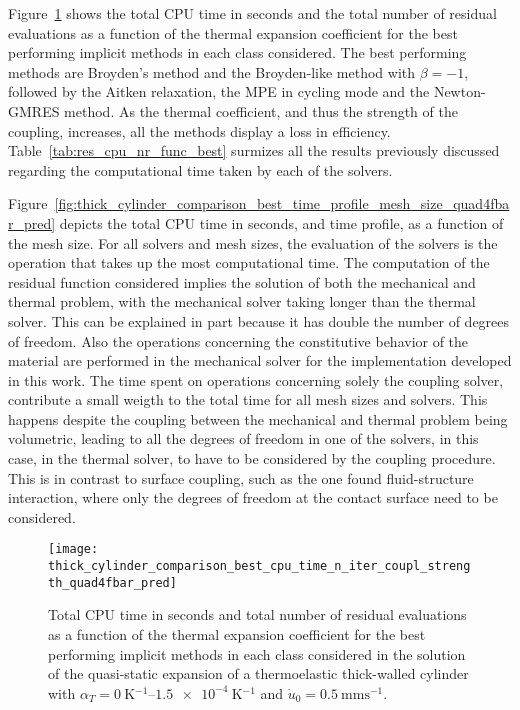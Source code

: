 Figure~\ref{fig:thick_cylinder_comparison_best_cpu_time_n_iter_coupl_strength_quad4fbar_pred} shows the total CPU time in seconds and the total number of residual evaluations as a function of the thermal expansion coefficient for the  best performing implicit methods in each class considered.
The best performing methods are Broyden's method and the Broyden-like method with \(\beta=-1\), followed by the Aitken relaxation, the MPE in cycling mode and the Newton-GMRES method.
As the thermal coefficient, and thus the strength of the coupling, increases, all the methods display a loss in efficiency.
Table~\ref{tab:res_cpu_nr_func_best} surmizes all the results previously discussed regarding the computational time taken by each of the solvers.

Figure~\ref{fig:thick_cylinder_comparison_best_time_profile_mesh_size_quad4fbar_pred} depicts the total CPU time in seconds, and time profile, as a function of the mesh size.
For all solvers and mesh sizes, the evaluation of the solvers is the operation that takes up the most computational time.
The computation of the residual function considered implies the solution of both the mechanical and thermal problem, with the mechanical solver taking longer than the thermal solver.
This can be explained in part because it has double the number of degrees of freedom.
Also the operations concerning the constitutive behavior of the material are performed in the mechanical solver for the implementation developed in this work.
The time spent on operations concerning solely the coupling solver, contribute a small weigth to the total time for all mesh sizes and solvers.
This happens despite the coupling between the mechanical and thermal problem being volumetric, leading to all the degrees of freedom in one of the solvers, in this case, in the thermal solver, to have to be considered by the coupling procedure.
This is in contrast to surface coupling, such as the one found fluid-structure interaction, where only the degrees of freedom at the contact surface need to be considered.

\begin{figure}[hbtp]
  \centering
  \texttt{[image: thick\_cylinder\_comparison\_best\_cpu\_time\_n\_iter\_coupl\_strength\_quad4fbar\_pred]}
  \caption{Total CPU time in seconds and total number of residual evaluations as a function of the thermal expansion coefficient for the  best performing implicit methods in each class considered in the solution of the quasi-static expansion of a thermoelastic thick-walled cylinder with \(\alpha_T=\SIrange{0}{1.5e-4}{\kelvin^{-1}}\) and \(\dot u_0 =\SI{0.5}{\milli\meter\second^{-1}}\).}
\label{fig:thick_cylinder_comparison_best_cpu_time_n_iter_coupl_strength_quad4fbar_pred}
\end{figure}

